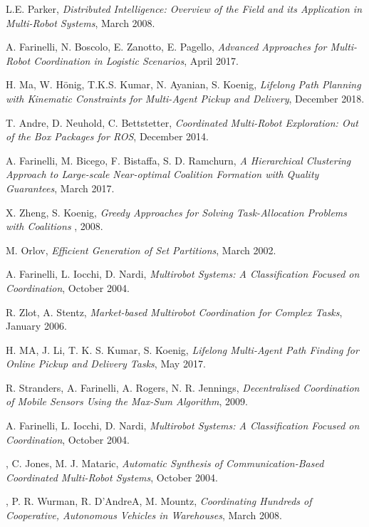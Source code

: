 \begin{thebibliography}{99}
     L.E. Parker, 
    \emph{Distributed Intelligence: Overview of the Field and its
    Application in Multi-Robot Systems}, March 2008.

     A. Farinelli, N. Boscolo, E. Zanotto, E. Pagello,
    \emph{Advanced Approaches for Multi-Robot Coordination in
    Logistic Scenarios}, April 2017.

     H. Ma, W. Hönig, T.K.S. Kumar, N. Ayanian, S. Koenig,
    \emph{Lifelong Path Planning with Kinematic Constraints
    for Multi-Agent Pickup and Delivery}, December 2018.

     T. Andre, D. Neuhold, C. Bettstetter,
    \emph{Coordinated Multi-Robot Exploration:
    Out of the Box Packages for ROS}, December 2014.

     A. Farinelli, M. Bicego, F. Bistaffa, S. D. Ramchurn,
    \emph{A Hierarchical Clustering Approach to Large-scale
    Near-optimal Coalition Formation with Quality
    Guarantees}, March 2017.

     X. Zheng, S. Koenig,
    \emph{Greedy Approaches for Solving Task-Allocation Problems with Coalitions}
    , 2008.

     M. Orlov,
    \emph{Efficient Generation of Set Partitions}, March 2002.

     A. Farinelli, L. Iocchi, D. Nardi,
    \emph{Multirobot Systems: A Classification
    Focused on Coordination}, October 2004.

     R. Zlot, A. Stentz, 
    \emph{Market-based Multirobot Coordination for Complex Tasks}, January 2006.

     H. MA, J. Li, T. K. S. Kumar, S. Koenig,
    \emph{Lifelong Multi-Agent Path Finding
    for Online Pickup and Delivery Tasks}, May 2017.

     R. Stranders, A. Farinelli, A. Rogers, N. R. Jennings,
    \emph{Decentralised Coordination of Mobile Sensors Using the Max-Sum Algorithm}, 2009.

     A. Farinelli, L. Iocchi, D. Nardi,
    \emph{Multirobot Systems: A Classification
    Focused on Coordination}, October 2004.

    , C. Jones, M. J. Mataric,
    \emph{Automatic Synthesis of Communication-Based
    Coordinated Multi-Robot Systems}, October 2004.

    , P. R. Wurman, R. D'AndreA, M. Mountz,
    \emph{Coordinating Hundreds of
    Cooperative, Autonomous
    Vehicles in Warehouses}, March 2008.
    
    
\end{thebibliography}